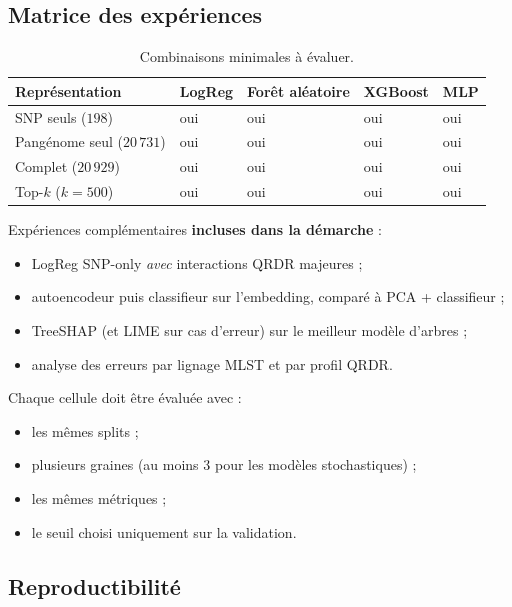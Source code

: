 \documentclass[11pt,a4paper]{article}
\begin{document}
\subsection{Matrice des expériences}

\begin{table}[H]
\centering
\caption{Combinaisons minimales à évaluer.}
\label{tab:experiments}
\begin{tabularx}{\textwidth}{lXXXX}
\toprule
\textbf{Représentation} & \textbf{LogReg} & \textbf{Forêt aléatoire} & \textbf{XGBoost} & \textbf{MLP} \\
\midrule
SNP seuls ($198$) & oui & oui & oui & oui \\
Pangénome seul ($20\,731$) & oui & oui & oui & oui \\
Complet ($20\,929$) & oui & oui & oui & oui \\
Top-$k$ ($k=500$) & oui & oui & oui & oui \\
\bottomrule
\end{tabularx}
\end{table}

Expériences complémentaires \textbf{incluses dans la démarche} :
\begin{itemize}[leftmargin=1.2em]
    \item LogReg SNP-only \emph{avec} interactions QRDR majeures ;
    \item autoencodeur puis classifieur sur l'embedding, comparé à PCA + classifieur ;
    \item TreeSHAP (et LIME sur cas d'erreur) sur le meilleur modèle d'arbres ;
    \item analyse des erreurs par lignage MLST et par profil QRDR.
\end{itemize}

Chaque cellule doit être évaluée avec :
\begin{itemize}[leftmargin=1.2em]
    \item les mêmes splits ;
    \item plusieurs graines (au moins $3$ pour les modèles stochastiques) ;
    \item les mêmes métriques ;
    \item le seuil choisi uniquement sur la validation.
\end{itemize}

\subsection{Reproductibilité}
\end{document}

